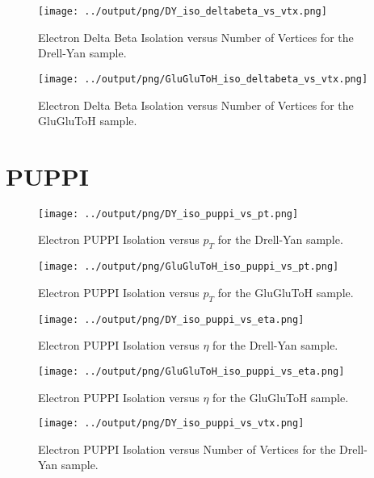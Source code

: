 \documentclass[11pt]{book}
\begin{document}
\begin{figure}[htb]
\centering
\texttt{[image: ../output/png/DY\_iso\_deltabeta\_vs\_vtx.png]}
\caption{Electron Delta Beta Isolation versus Number of Vertices for the Drell-Yan sample.}
\label{fig:dy_iso_deltabeta_vs_vtx}
\end{figure}

\begin{figure}[htb]
\centering
\texttt{[image: ../output/png/GluGluToH\_iso\_deltabeta\_vs\_vtx.png]}
\caption{Electron Delta Beta Isolation versus Number of Vertices for the GluGluToH sample.}
\label{fig:ggh_iso_deltabeta_vs_vtx}
\end{figure}
\clearpage

\section{PUPPI}

\begin{figure}[htb]
\centering
\texttt{[image: ../output/png/DY\_iso\_puppi\_vs\_pt.png]}
\caption{Electron PUPPI Isolation versus $p_{T}$ for the Drell-Yan sample.}
\label{fig:dy_iso_puppi_vs_pt}
\end{figure}

\begin{figure}[htb]
\centering
\texttt{[image: ../output/png/GluGluToH\_iso\_puppi\_vs\_pt.png]}
\caption{Electron PUPPI Isolation versus $p_{T}$ for the GluGluToH sample.}
\label{fig:ggh_iso_puppi_vs_pt}
\end{figure}

\begin{figure}[htb]
\centering
\texttt{[image: ../output/png/DY\_iso\_puppi\_vs\_eta.png]}
\caption{Electron PUPPI Isolation versus $\eta$ for the Drell-Yan sample.}
\label{fig:dy_iso_puppi_vs_eta}
\end{figure}

\begin{figure}[htb]
\centering
\texttt{[image: ../output/png/GluGluToH\_iso\_puppi\_vs\_eta.png]}
\caption{Electron PUPPI Isolation versus $\eta$ for the GluGluToH sample.}
\label{fig:ggh_iso_puppi_vs_eta}
\end{figure}

\begin{figure}[htb]
\centering
\texttt{[image: ../output/png/DY\_iso\_puppi\_vs\_vtx.png]}
\caption{Electron PUPPI Isolation versus Number of Vertices for the Drell-Yan sample.}
\label{fig:dy_iso_puppi_vs_vtx}
\end{figure}
\end{document}
